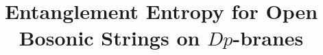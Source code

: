 \documentclass[aps,showpacs,showkeys]{revtex4}
\begin{document}
\def\a{\alpha}
\def\b{\beta}
\def\d{{\delta}}
\def\l{\lambda}
\def\e{\epsilon}
\def\p{\partial}
\def\m{\mu}
\def\n{\nu}
\def\t{\tau}
\def\th{\theta}
\def\s{\sigma}
\def\g{\gamma}
\def\o{\omega}
\def\r{\rho}
\def\z{\zeta}
\def\D{\Delta}
\def\half{\frac{1}{2}}
\def\hatt{{\hat t}}
\def\hatx{{\hat x}}
\def\hatp{{\hat p}}
\def\hatX{{\hat X}}
\def\hatY{{\hat Y}}
\def\hatP{{\hat P}}
\def\haty{{\hat y}}
\def\whatX{{\widehat{X}}}
\def\whata{{\widehat{\alpha}}}
\def\whatb{{\widehat{\beta}}}
\def\whatV{{\widehat{V}}}
\def\hatth{{\hat \theta}}
\def\hatta{{\hat \tau}}
\def\hatrh{{\hat \rho}}
\def\hatva{{\hat \varphi}}
\def\barx{{\bar x}}
\def\bary{{\bar y}}
\def\barz{{\bar z}}
\def\baro{{\bar \omega}}
\def\barpsi{{\bar \psi}}
\def\sp{\sigma^\prime}
\def\nn{\nonumber}
\def\cb{{\cal B}}
\def\2pap{2\pi\alpha^\prime}
\def\wideA{\widehat{A}}
\def\wideF{\widehat{F}}
\def\beq{\begin{eqnarray}}
 \def\eeq{\end{eqnarray}}
 \def\4pap{4\pi\a^\prime}
 \def\op{\omega^\prime}
 \def\xp{{x^\prime}}
 \def\sp{{\s^\prime}}
 \def\ap{{\a^\prime}}
 \def\tp{{\t^\prime}}
 \def\zp{{z^\prime}}
 \def\xpp{x^{\prime\prime}}
 \def\xppp{x^{\prime\prime\prime}}
 \def\barxp{{\bar x}^\prime}
 \def\barxpp{{\bar x}^{\prime\prime}}
 \def\barxppp{{\bar x}^{\prime\prime\prime}}
 \def\zetap{{\zeta^\prime}}
 \def\barchi{{\bar \chi}}
 \def\baro{{\bar \omega}}
 \def\bpsi{{\bar \psi}}
 \def\barg{{\bar g}}
 \def\barz{{\bar z}}
 \def\bareta{{\bar \eta}}
 \def\ta{{\tilde \a}}
 \def\tb{{\tilde \b}}
 \def\tc{{\tilde c}}
 \def\tz{{\tilde z}}
 \def\tJ{{\tilde J}}
 \def\tpsi{\tilde{\psi}}
 \def\tal{{\tilde \alpha}}
 \def\tbe{{\tilde \beta}}
 \def\tga{{\tilde \gamma}}
 \def\tchi{{\tilde{\chi}}}
 \def\barth{{\bar \theta}}
 \def\bareta{{\bar \eta}}
 \def\barom{{\bar \omega}}
 \def\bole{{\boldsymbol \epsilon}}
 \def\bolth{{\boldsymbol \theta}}
 \def\bomega{{\boldsymbol \omega}}
 \def\bolmu{{\boldsymbol \mu}}
 \def\bolal{{\boldsymbol \alpha}}
 \def\bolbe{{\boldsymbol \beta}}
 \def\bolL{{\boldsymbol  L}}
 \def\bolX{{\boldsymbol X}}
 \def\boln{{\boldsymbol n}}
 \def\bolp{{\boldsymbol p}}
 \def\bolx{{\boldsymbol x}}
 \def\bols{{\boldsymbol s}}
 \def\bolS{{\boldsymbol S}}
 \def\bola{{\boldsymbol a}}
 \def\bolA{{\boldsymbol A}}
 \def\bolJ{{\boldsymbol J}}
 \def\tr{{\rm tr}}
 
 
 
 
\setcounter{page}{1}
\title[]{Entanglement Entropy for Open Bosonic Strings on $Dp$-branes
}
\end{document}

